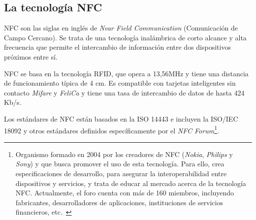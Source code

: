 


  \subsection{La tecnología \acs{NFC}}
\acs{NFC} son las siglas en inglés de \emph{Near Field Communication}
(Comunicación de Campo Cercano). Se trata de una tecnología inalámbrica de
corto alcance y alta frecuencia que permite el intercambio de información
entre dos dispositivos próximos entre sí.

\acs{NFC} se basa en la tecnología \acs{RFID}, que opera a 13,56MHz y tiene
una distancia de funcionamiento típica de 4 cm. Es compatible con tarjetas
inteligentes sin contacto \emph{Mifare} y \emph{FeliCa} y tiene una tasa de
intercambio de datos de hasta 424 Kb/s.

Los estándares de \acs{NFC} están basados en la \acs{ISO} 14443 e incluyen
la \acs{ISO}/\acs{IEC} 18092 y otros estándares definidos específicamente por
el \emph{NFC Forum}\footnote{Organismo formado en 2004 por los creadores de
\acs{NFC} (\emph{Nokia}, \emph{Philips} y \emph{Sony}) y que busca promover
el uso de esta tecnología. Para ello, crea especificaciones de desarrollo,
para asegurar la interoperabilidad entre dispositivos y servicios, y trata
de educar al mercado acerca de la tecnología \acs{NFC}. Actualmente, el foro
cuenta con más de 160 miembros, incluyendo fabricantes, desarrolladores de
aplicaciones, instituciones de servicios financieros, etc.~\cite{bib:nfcForum}}.

